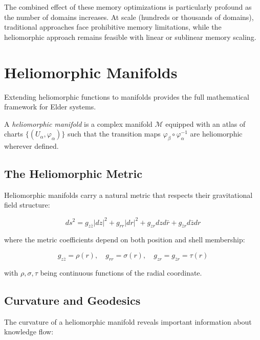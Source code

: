 The combined effect of these memory optimizations is particularly profound as the number of domains increases. At scale (hundreds or thousands of domains), traditional approaches face prohibitive memory limitations, while the heliomorphic approach remains feasible with linear or sublinear memory scaling.

\section{Heliomorphic Manifolds}

Extending heliomorphic functions to manifolds provides the full mathematical framework for Elder systems.

\begin{definition}
A \textit{heliomorphic manifold} is a complex manifold $\mathcal{M}$ equipped with an atlas of charts $\{(U_{\alpha}, \varphi_{\alpha})\}$ such that the transition maps $\varphi_{\beta} \circ \varphi_{\alpha}^{-1}$ are heliomorphic wherever defined.
\end{definition}

\subsection{The Heliomorphic Metric}

Heliomorphic manifolds carry a natural metric that respects their gravitational field structure:

\begin{equation}
ds^2 = g_{z\bar{z}}|dz|^2 + g_{rr}|dr|^2 + g_{z r}dz d\bar{r} + g_{\bar{z}r}d\bar{z}dr
\end{equation}

where the metric coefficients depend on both position and shell membership:

\begin{equation}
g_{z\bar{z}} = \rho(r), \quad g_{rr} = \sigma(r), \quad g_{z r} = g_{\bar{z}r} = \tau(r)
\end{equation}

with $\rho, \sigma, \tau$ being continuous functions of the radial coordinate.

\subsection{Curvature and Geodesics}

The curvature of a heliomorphic manifold reveals important information about knowledge flow:

